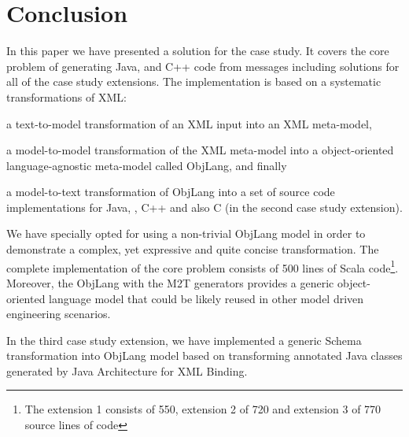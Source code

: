 
\section{Conclusion}
\label{sec:Conclusion}

In this paper we have presented a \SIGMA solution for the \TTC \FIXML case study.
It covers the core problem of generating Java, \Csharp and C++ code from \FIXML messages including solutions for all of the case study extensions.
The implementation is based on a systematic transformations of XML:
\begin{inparaenum}[(1)]
	\item a text-to-model transformation of an XML input into an XML meta-model,
	\item a model-to-model transformation of the XML meta-model into a object-oriented language-agnostic meta-model called ObjLang, and finally
	\item a model-to-text transformation of ObjLang into a set of source code implementations for Java, \Csharp, C++ and also C (in the second case study extension).
\end{inparaenum}
We have specially opted for using a non-trivial ObjLang model in order to demonstrate a complex, yet expressive and quite concise transformation.
The complete implementation of the core problem consists of 500 lines of Scala code\footnote{The extension 1 consists of 550, extension 2 of 720 and extension 3 of 770 source lines of code}.
Moreover, the ObjLang with the M2T generators provides a generic object-oriented language model that could be likely reused in other model driven engineering scenarios.

In the third case study extension, we have implemented a generic \FIXML Schema transformation into ObjLang model based on transforming annotated Java classes generated by Java Architecture for XML Binding.
